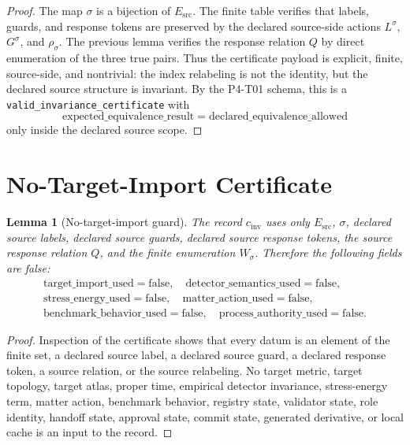 \documentclass[11pt]{article}
\newcommand{\Esrc}{E_{\mathrm{src}}}
\newtheorem{lemma}{Lemma}
\begin{document}
\begin{proof}
The map \(\sigma\) is a bijection of \(\Esrc\). The finite table verifies that
labels, guards, and response tokens are preserved by the declared source-side
actions \(L^{\sigma}\), \(G^{\sigma}\), and \(\rho_{\sigma}\). The previous
lemma verifies the response relation \(Q\) by direct enumeration of the three
true pairs. Thus the certificate payload is explicit, finite, source-side,
and nontrivial: the index relabeling is not the identity, but the declared
source structure is invariant. By the P4-T01 schema, this is a
\texttt{valid\_invariance\_certificate} with
\[
  \mathrm{expected\_equivalence\_result}
  =\mathrm{declared\_equivalence\_allowed}
\]
only inside the declared source scope.
\end{proof}

\section{No-Target-Import Certificate}

\begin{lemma}[No-target-import guard]
The record \(c_{\mathrm{inv}}\) uses only \(\Esrc\), \(\sigma\), declared
source labels, declared source guards, declared source response tokens, the
source response relation \(Q\), and the finite enumeration \(W_{\sigma}\).
Therefore the following fields are false:
\[
\begin{gathered}
\mathrm{target\_import\_used}=\mathrm{false},\quad
\mathrm{detector\_semantics\_used}=\mathrm{false},\\
\mathrm{stress\_energy\_used}=\mathrm{false},\quad
\mathrm{matter\_action\_used}=\mathrm{false},\\
\mathrm{benchmark\_behavior\_used}=\mathrm{false},\quad
\mathrm{process\_authority\_used}=\mathrm{false}.
\end{gathered}
\]
\end{lemma}

\begin{proof}
Inspection of the certificate shows that every datum is an element of the
finite set, a declared source label, a declared source guard, a declared
response token, a source relation, or the source relabeling. No target metric,
target topology, target atlas, proper time, empirical detector invariance,
stress-energy term, matter action, benchmark behavior, registry state,
validator state, role identity, handoff state, approval state, commit state,
generated derivative, or local cache is an input to the record.
\end{proof}
\end{document}
